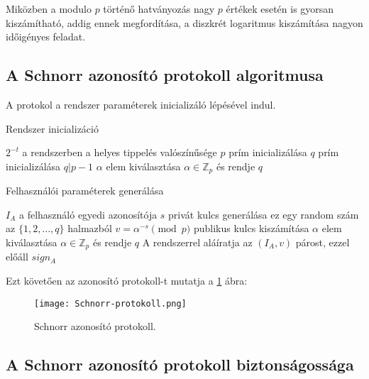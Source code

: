 Miközben a modulo $p$ történő hatványozás nagy $p$ értékek esetén is gyorsan kiszámítható, addig ennek megfordítása, a diszkrét logaritmus kiszámítása nagyon időigényes feladat.

\subsection{A Schnorr azonosító protokoll algoritmusa}

A protokol a rendszer paraméterek inicializáló lépésével indul.

\begin{algorithm}[H]
    \caption{Rendszer inicializáció}
    \label{algorithm:systemInit}
    \begin{algorithmic}
         \Comment $2^{-t}$ a rendszerben a helyes tippelés valószínűsége
        \State $p$ prím inicializálása
        \State $q$ prím inicializálása \Comment $q | p-1$
        \State $\alpha$ elem kiválasztása \Comment $\alpha \in \mathbb{Z}_{p}$ és rendje $q$
        \EndProcedure
    \end{algorithmic}
\end{algorithm}

\begin{algorithm}[H]
    \caption{Felhasználói paraméterek generálása}
    \label{algorithm:userInit}
    \begin{algorithmic}
         \Comment $I_{A}$ a felhasználó egyedi azonosítója
        \State $s$ privát kulcs generálása \Comment ez egy random szám az $\{1,2,...,q\}$ halmazból
        \State $v = \alpha^{-s} \pmod{p}$ publikus kulcs kiszámítása
        \State $\alpha$ elem kiválasztása \Comment $\alpha \in \mathbb{Z}_{p}$ és rendje $q$
        \State A rendszerrel aláíratja az $(I_{A}, v)$ párost, ezzel előáll $sign_{A}$
        \EndProcedure
    \end{algorithmic}
\end{algorithm}

Ezt követően az azonosító protokoll-t mutatja a \ref{Figure::SchnorrProt} ábra:

\begin{figure}[H]
    \centering
    \texttt{[image: Schnorr-protokoll.png]}
    \caption{Schnorr azonosító protokoll.}
    \label{Figure::SchnorrProt}
\end{figure}

\subsection{A Schnorr azonosító protokoll biztonságossága}

